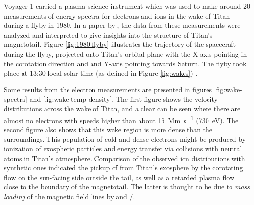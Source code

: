 \documentclass[12pt, parskip=full*, abstract]{scrartcl}
\begin{document}




Voyager 1 carried a plasma science instrument which was used to make around 20 measurements of energy spectra for electrons and ions in the wake of Titan during a flyby in 1980. In a paper by \textcite{hartle-1982}, the data from these measurements were analyzed and interpreted to give insights into the structure of Titan's magnetotail. Figure \ref{fig:1980-flyby} illustrates the trajectory of the spacecraft during the flyby, projected onto Titan's orbital plane with the X-axis pointing in the corotation direction and and Y-axis pointing towards Saturn. The flyby took place at 13:30 local solar time (as defined in Figure \ref{fig:wakes}) \parencite{ness-1982}. 

Some results from the electron measurements are presented in figures \ref{fig:wake-spectra} and \ref{fig:wake-temp-density}. The first figure shows the velocity distributions across the wake of Titan, and a clear  can be seen where there are almost no electrons with speeds higher than about \SI{16}{\mega\metre\per\second} (\SI{730}{\electronvolt}). The second figure also shows that this wake region is more dense than the surroundings. This population of cold and dense electrons might be produced by ionization of exospheric particles and energy transfer via collisions with neutral atoms in Titan's atmosphere. Comparison of the observed ion distributions with synthetic ones indicated the pickup of  from Titan's exosphere by the corotating flow on the sun-facing side outside the tail, as well as a retarded plasma flow close to the boundary of the magnetotail. The latter is thought to be due to \textit{mass loading} of the magnetic field lines by  and /.
\end{document}

